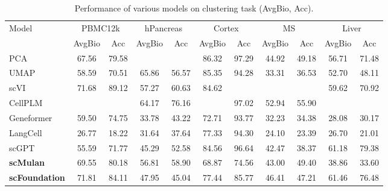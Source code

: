 \begin{table}[htbp]

  \centering

  \scriptsize

  \caption{Performance of various models on clustering task (AvgBio, Acc).}

  \label{tab:clustering_performance_all}

  \setlength{\tabcolsep}{2pt}

  \begin{tabular}{l|cc|cc|cc|cc|cc}

    \toprule
    \multirow{2}{*}{Model}
      & \multicolumn{2}{c}{PBMC12k} & \multicolumn{2}{c}{hPancreas} & \multicolumn{2}{c}{Cortex} & \multicolumn{2}{c}{MS} & \multicolumn{2}{c}{Liver} \\
    \cmidrule(lr){2-3}\cmidrule(lr){4-5}\cmidrule(lr){6-7}\cmidrule(lr){8-9}\cmidrule(lr){10-11}
      & AvgBio & Acc & AvgBio & Acc & AvgBio & Acc & AvgBio & Acc & AvgBio & Acc \\
    \midrule

    PCA      & 67.56 & 79.58 & \cellcolor{gray!25}{69.68} & \cellcolor{gray!25}{77.56} & 86.32 & 97.29 & 44.92 & 49.18 & 56.71 & 71.48 \\
    UMAP      & 58.59 & 70.51 & 65.86 & 56.57 & 85.35 & 94.28 & 33.31 & 36.53 & 52.70 & 48.11 \\
    scVI      & 71.68 & 89.12 & 57.27 & 60.63 & 84.62 & \cellcolor{gray!25}{98.75} & \cellcolor{gray!25}{58.56} & \cellcolor{gray!25}{64.76} & 59.62 & 70.92 \\
    CellPLM      & \cellcolor{gray!25}{80.62} & \cellcolor{gray!25}{92.51} & 64.17 & 76.16 & \cellcolor{gray!25}{87.24} & 97.02 & 52.94 & 55.90 & \cellcolor{gray!25}{67.99} & \cellcolor{gray!25}{80.98} \\
    Geneformer      & 59.50 & 74.75 & 33.78 & 43.22 & 72.71 & 93.77 & 32.23 & 34.38 & 28.08 & 30.17 \\
    LangCell      & 26.77 & 18.22 & 31.64 & 37.64 & 77.33 & 94.30 & 24.10 & 23.39 & 26.70 & 21.01 \\
    scGPT      & 55.59 & 71.77 & 45.29 & 52.58 & 84.56 & 96.64 & 42.47 & 38.37 & 61.18 & 79.38 \\
    \cellcolor{gray!25}\textbf{scMulan}      & 69.55 & 80.18 & 56.81 & 58.90 & 68.87 & 74.56 & 43.00 & 49.40 & 38.86 & 33.60 \\
    \cellcolor{gray!25}\textbf{scFoundation}      & 71.81 & 84.11 & 47.95 & 45.04 & 77.44 & 85.77 & 46.41 & 47.21 & 61.46 & 76.48 \\
    \bottomrule
  \end{tabular}


\end{table}
